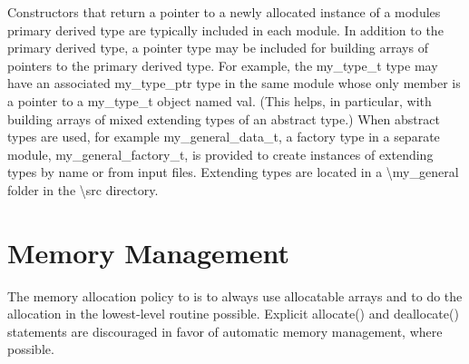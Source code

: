 Constructors that return a pointer to a newly allocated instance of a module\textquotesingle{}s primary derived type are typically included in each module. In addition to the primary derived type, a pointer type may be included for building arrays of pointers to the primary derived type. For example, the {\ttfamily my\+\_\+type\+\_\+t} type may have an associated {\ttfamily my\+\_\+type\+\_\+ptr} type in the same module whose only member is a pointer to a {\ttfamily my\+\_\+type\+\_\+t} object named {\ttfamily val}. (This helps, in particular, with building arrays of mixed extending types of an abstract type.) When abstract types are used, for example {\ttfamily my\+\_\+general\+\_\+data\+\_\+t}, a factory type in a separate module, {\ttfamily my\+\_\+general\+\_\+factory\+\_\+t}, is provided to create instances of extending types by name or from input files. Extending types are located in a {\ttfamily \textbackslash{}my\+\_\+general} folder in the {\ttfamily \textbackslash{}src} directory.\hypertarget{coding_style_mem_manage}{}\section{Memory Management}\label{coding_style_mem_manage}
The memory allocation policy to is to always use {\ttfamily allocatable} arrays and to do the allocation in the lowest-\/level routine possible. Explicit {\ttfamily allocate()} and {\ttfamily deallocate()} statements are discouraged in favor of automatic memory management, where possible. 